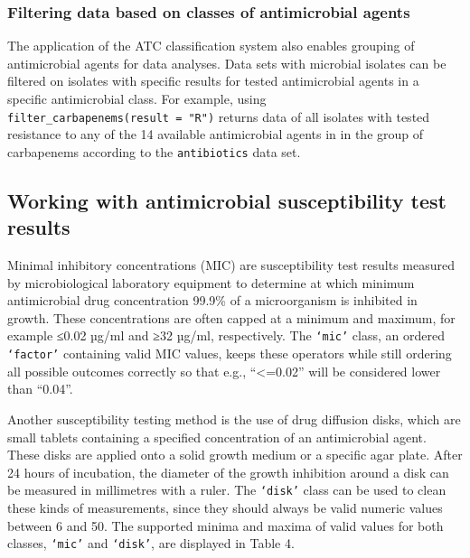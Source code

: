 \documentclass[
]{book}
\begin{document}
\hypertarget{filtering-data-based-on-classes-of-antimicrobial-agents}{%
\subsubsection{Filtering data based on classes of antimicrobial agents}\label{filtering-data-based-on-classes-of-antimicrobial-agents}}

The application of the ATC classification system also enables grouping of antimicrobial agents for data analyses. Data sets with microbial isolates can be filtered on isolates with specific results for tested antimicrobial agents in a specific antimicrobial class. For example, using \texttt{filter\_carbapenems(result\ =\ "R")} returns data of all isolates with tested resistance to any of the 14 available antimicrobial agents in in the group of carbapenems according to the \texttt{antibiotics} data set.

\hypertarget{working-with-antimicrobial-susceptibility-test-results}{%
\subsection{Working with antimicrobial susceptibility test results}\label{working-with-antimicrobial-susceptibility-test-results}}

Minimal inhibitory concentrations (MIC) are susceptibility test results measured by microbiological laboratory equipment to determine at which minimum antimicrobial drug concentration 99.9\% of a microorganism is inhibited in growth. These concentrations are often capped at a minimum and maximum, for example ≤0.02 µg/ml and ≥32 µg/ml, respectively. The \texttt{‘mic’} class, an ordered \texttt{‘factor’} containing valid MIC values, keeps these operators while still ordering all possible outcomes correctly so that e.g., ``\textless=0.02'' will be considered lower than ``0.04''.

Another susceptibility testing method is the use of drug diffusion disks, which are small tablets containing a specified concentration of an antimicrobial agent. These disks are applied onto a solid growth medium or a specific agar plate. After 24 hours of incubation, the diameter of the growth inhibition around a disk can be measured in millimetres with a ruler. The \texttt{‘disk’} class can be used to clean these kinds of measurements, since they should always be valid numeric values between 6 and 50. The supported minima and maxima of valid values for both classes, \texttt{‘mic’} and \texttt{‘disk’}, are displayed in Table 4.
\end{document}
